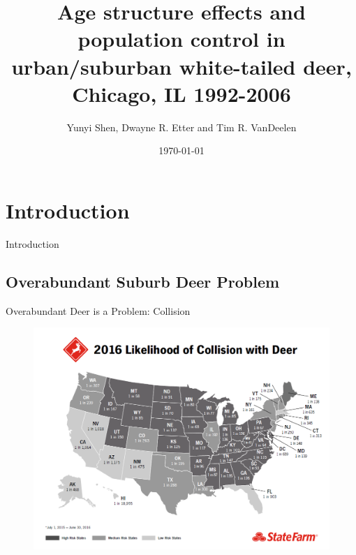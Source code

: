 \documentclass{beamer}
\title{Age structure effects and population control in urban/suburban white-tailed deer, Chicago, IL 1992-2006}
\author{Yunyi Shen, Dwayne R. Etter and Tim R. VanDeelen}
\institute{UW Madison\\ Department of Forest and Wildlife Ecology}
\date{\today}
\begin{document}
\frame{\titlepage}
\frame{\tableofcontents}

\section{Introduction}


\begin{frame}
	\huge{Introduction}
\end{frame}

\subsection{Overabundant Suburb Deer Problem}


\begin{frame}{Overabundant Deer is a Problem: Collision}
\begin{figure}[ht]
	\centering
	\includegraphics[scale=.23]{fig/Chicago_deer/1920_deermap.png}
	\label{deermap}
\end{figure}
\end{frame}
\end{document}
